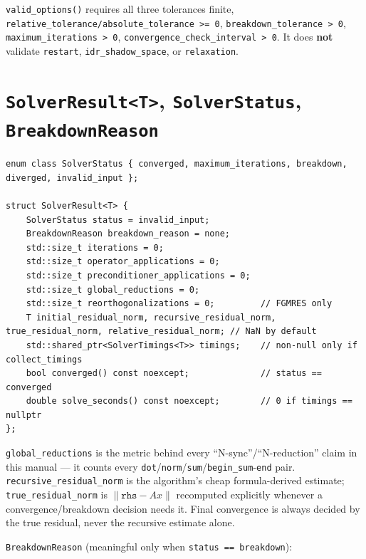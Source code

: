 \documentclass[11pt,a4paper]{report}
\begin{document}
\lstinline!valid_options()! requires all three tolerances finite,
\lstinline!relative_tolerance/absolute_tolerance >= 0!, \lstinline!breakdown_tolerance > 0!,
\lstinline!maximum_iterations > 0!, \lstinline!convergence_check_interval > 0!. It
does \textbf{not} validate \lstinline!restart!, \lstinline!idr_shadow_space!, or
\lstinline!relaxation!.

\section{\texorpdfstring{\lstinline!SolverResult<T>!, \lstinline!SolverStatus!, \lstinline!BreakdownReason!}{SolverResult<T>, SolverStatus, BreakdownReason}}
\label{sec:5.3}

\begin{lstlisting}
enum class SolverStatus { converged, maximum_iterations, breakdown, diverged, invalid_input };

struct SolverResult<T> {
    SolverStatus status = invalid_input;
    BreakdownReason breakdown_reason = none;
    std::size_t iterations = 0;
    std::size_t operator_applications = 0;
    std::size_t preconditioner_applications = 0;
    std::size_t global_reductions = 0;
    std::size_t reorthogonalizations = 0;         // FGMRES only
    T initial_residual_norm, recursive_residual_norm, true_residual_norm, relative_residual_norm; // NaN by default
    std::shared_ptr<SolverTimings<T>> timings;    // non-null only if collect_timings
    bool converged() const noexcept;              // status == converged
    double solve_seconds() const noexcept;        // 0 if timings == nullptr
};
\end{lstlisting}

\lstinline!global_reductions! is the metric behind every ``N-sync''/``N-reduction''
claim in this manual --- it counts every \lstinline!dot!/\lstinline!norm!/\lstinline!sum!/\lstinline!begin_sum!-\lstinline!end!
pair. \lstinline!recursive_residual_norm! is the algorithm's cheap
formula-derived estimate; \lstinline!true_residual_norm! is $\|\mathtt{rhs} - Ax\|$
recomputed explicitly whenever a convergence/breakdown decision needs
it. Final convergence is always decided by the true residual, never the
recursive estimate alone.

\lstinline!BreakdownReason! (meaningful only when \lstinline!status == breakdown!):
\end{document}
